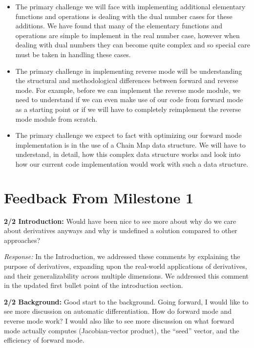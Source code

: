 \documentclass[11pt]{article}
\begin{document}
\begin{itemize}
\item
  The primary challenge we will face with implementing additional
  elementary functions and operations is dealing with the dual number
  cases for these additions. We have found that many of the elementary
  functions and operations are simple to implement in the real number
  case, however when dealing with dual numbers they can become quite
  complex and so special care must be taken in handling these cases.
\item
  The primary challenge in implementing reverse mode will be
  understanding the structural and methodological differences between
  forward and reverse mode. For example, before we can implement the
  reverse mode module, we need to understand if we can even make use of
  our code from forward mode as a starting point or if we will have to
  completely reimplement the reverse mode module from scratch.
\item
  The primary challenge we expect to fact with optimizing our forward
  mode implementation is in the use of a Chain Map data structure. We
  will have to understand, in detail, how this complex data structure
  works and look into how our current code implementation would work
  with such a data structure.
\end{itemize}

    \hypertarget{feedback-from-milestone-1}{%
\section{Feedback From Milestone 1}\label{feedback-from-milestone-1}}

    \textbf{2/2 Introduction:} Would have been nice to see more about why do
we care about derivatives anyways and why is undefined a solution
compared to other approaches?

\emph{Response:} In the Introduction, we addressed these comments by
explaining the purpose of derivatives, expanding upon the real-world
applications of derivatives, and their generalizability across multiple
dimensions. We addressed this comment in the updated first bullet point
of the introduction section.

\textbf{2/2 Background:} Good start to the background. Going forward, I
would like to see more discussion on automatic differentiation. How do
forward mode and reverse mode work? I would also like to see more
discussion on what forward mode actually computes (Jacobian-vector
product), the ``seed'' vector, and the efficiency of forward mode.
\end{document}

